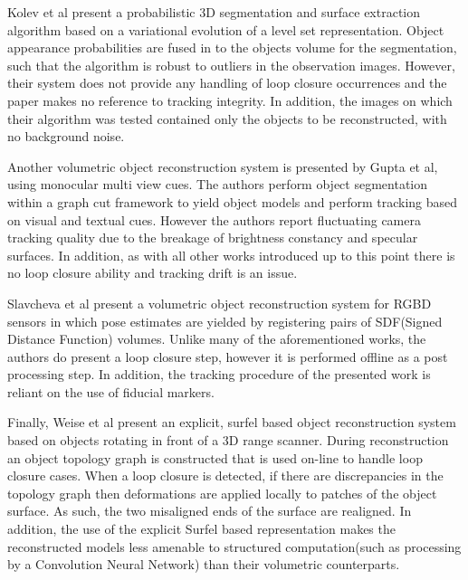 Kolev et al present a probabilistic 3D segmentation and surface extraction algorithm\cite{Kolev2006} based on a variational evolution of a level 
set representation. Object appearance probabilities are fused in to the objects volume for the segmentation, such that the algorithm is robust to 
outliers in the observation images. However, their system does not provide any handling of 
loop closure occurrences and the paper makes no reference to tracking integrity. In addition, the images on which their algorithm was tested 
contained only the objects to be reconstructed, with no background noise.

Another volumetric object reconstruction system is presented by Gupta et al\cite{Gupta2016}, using monocular multi view cues. The authors 
perform object segmentation within a graph cut framework to yield object models and perform tracking based on visual and textual cues. 
However the authors report fluctuating camera tracking quality due to the breakage of brightness constancy and specular surfaces. In addition, 
as with all other works introduced up to this point there is no loop closure ability and tracking drift is an issue.

Slavcheva et al present a volumetric object reconstruction system for RGBD sensors in which pose estimates are yielded by registering pairs of 
SDF(Signed Distance Function) volumes. Unlike many of the aforementioned works, the authors do present a loop closure step, however it is 
performed offline as a post processing step. In addition, the tracking procedure of the presented work is reliant on the use of fiducial markers.

Finally, Weise et al present an explicit, surfel based object reconstruction system\cite{Weise2009} based on objects rotating in front of a 3D 
range scanner. During reconstruction an object topology graph is constructed that is used on-line to handle loop closure cases. When a loop 
closure is detected, if there are discrepancies in the topology graph then deformations are applied locally to patches of the object surface. As 
such, the two misaligned ends of the surface are realigned. In addition, the use of the explicit Surfel based representation makes the reconstructed models less amenable to structured  computation(such as processing by a Convolution Neural Network) than their volumetric counterparts. 